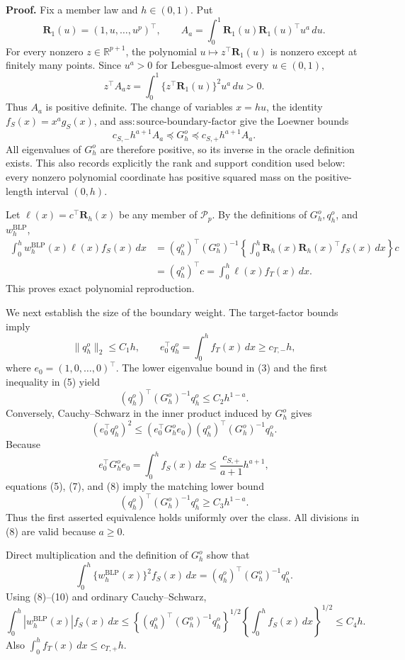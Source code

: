 \textbf{Proof.}
Fix a member law and \(h\in(0,1)\). Put
\[
\mathbf R_1(u)=(1,u,\ldots,u^p)^\top,
\qquad
A_a=\int_0^1\mathbf R_1(u)\mathbf R_1(u)^\top u^a\,du.
\tag{1}
\]
For every nonzero \(z\in\mathbb R^{p+1}\), the polynomial
\(u\mapsto z^\top\mathbf R_1(u)\) is nonzero except at finitely many points. Since
\(u^a>0\) for Lebesgue-almost every \(u\in(0,1)\),
\[
z^\top A_a z=\int_0^1\{z^\top\mathbf R_1(u)\}^2u^a\,du>0.
\tag{2}
\]
Thus \(A_a\) is positive definite. The change of variables \(x=hu\), the identity
\(f_S(x)=x^ag_S(x)\), and \(\mathrm{ass:source\text{-}boundary\text{-}factor}\) give the Loewner bounds
\[
c_{S,-}h^{a+1}A_a
\preceq G_h^o
\preceq c_{S,+}h^{a+1}A_a.
\tag{3}
\]
All eigenvalues of \(G_h^o\) are therefore positive, so its inverse in the oracle definition exists. This also records explicitly the rank and support condition used below: every nonzero polynomial coordinate has positive squared mass on the positive-length interval \((0,h)\).

Let \(\ell(x)=c^\top\mathbf R_h(x)\) be any member of \(\mathcal P_p\). By the definitions of \(G_h^o,q_h^o\), and \(w_h^{\mathrm{BLP}}\),
\[
\begin{aligned}
\int_0^h w_h^{\mathrm{BLP}}(x)\ell(x)f_S(x)\,dx
&=(q_h^o)^\top(G_h^o)^{-1}
  \left\{\int_0^h\mathbf R_h(x)\mathbf R_h(x)^\top f_S(x)\,dx\right\}c\\
&=(q_h^o)^\top c
=\int_0^h\ell(x)f_T(x)\,dx.
\end{aligned}
\tag{4}
\]
This proves exact polynomial reproduction.

We next establish the size of the boundary weight. The target-factor bounds imply
\[
\|q_h^o\|_2\le C_1h,
\qquad
e_0^\top q_h^o=\int_0^hf_T(x)\,dx\ge c_{T,-}h,
\tag{5}
\]
where \(e_0=(1,0,\ldots,0)^\top\). The lower eigenvalue bound in (3) and the first inequality in (5) yield
\[
(q_h^o)^\top(G_h^o)^{-1}q_h^o\le C_2h^{1-a}.
\tag{6}
\]
Conversely, Cauchy--Schwarz in the inner product induced by \(G_h^o\) gives
\[
(e_0^\top q_h^o)^2
\le(e_0^\top G_h^oe_0)(q_h^o)^\top(G_h^o)^{-1}q_h^o.
\tag{7}
\]
Because
\[
e_0^\top G_h^oe_0=\int_0^hf_S(x)\,dx
\le \frac{c_{S,+}}{a+1}h^{a+1},
\tag{8}
\]
equations (5), (7), and (8) imply the matching lower bound
\[
(q_h^o)^\top(G_h^o)^{-1}q_h^o\ge C_3h^{1-a}.
\tag{9}
\]
Thus the first asserted equivalence holds uniformly over the class. All divisions in (8) are valid because \(a\ge0\).

Direct multiplication and the definition of \(G_h^o\) show that
\[
\int_0^h\{w_h^{\mathrm{BLP}}(x)\}^2f_S(x)\,dx
=(q_h^o)^\top(G_h^o)^{-1}q_h^o.
\tag{10}
\]
Using (8)--(10) and ordinary Cauchy--Schwarz,
\[
\int_0^h|w_h^{\mathrm{BLP}}(x)|f_S(x)\,dx
\le
\left\{(q_h^o)^\top(G_h^o)^{-1}q_h^o\right\}^{1/2}
\left\{\int_0^hf_S(x)\,dx\right\}^{1/2}
\le C_4h.
\tag{11}
\]
Also \(\int_0^hf_T(x)\,dx\le c_{T,+}h\).

